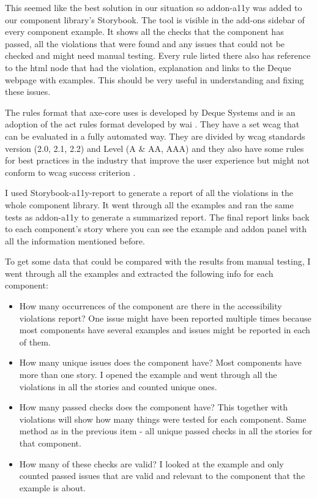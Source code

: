 \documentclass{master_thesis}
\begin{document}
This seemed like the best solution in our situation so addon-a11y was added to our component library’s Storybook. The tool is visible in the add-ons sidebar of every component example. It shows all the checks that the component has passed, all the violations that were found and any issues that could not be checked and might need manual testing. Every rule listed there also has reference to the \ac{html} node that had the violation, explanation and links to the Deque webpage with examples. This should be very useful in understanding and fixing these issues.

The rules format that axe-core uses is developed by Deque Systems and is an adoption of the \ac{act} rules format developed by \ac{wai} \citep{Fiers2017}. They have a set \ac{wcag} that can be evaluated in a fully automated way. They are divided by \ac{wcag} standards version (2.0, 2.1, 2.2) and Level (A \& AA, AAA) and they also have some rules for best practices in the industry that improve the user experience but might not conform to \ac{wcag} success criterion \citep{Fiers2023}.

I used Storybook-a11y-report \citep{Karube2020} to generate a report of all the violations in the whole component library. It went through all the examples and ran the same tests as addon-a11y to generate a summarized report. The final report links back to each component's story where you can see the example and addon panel with all the information mentioned before. 

To get some data that could be compared with the results from manual testing, I went through all the examples and extracted the following info for each component:

\begin{itemize}
	\item How many occurrences of the component are there in the accessibility violations report? One issue might have been reported multiple times because most components have several examples and issues might be reported in each of them.
	\item How many unique issues does the component have? Most components have more than one story. I opened the example and went through all the violations in all the stories and counted unique ones.
	\item How many passed checks does the component have? This together with violations will show how many things were tested for each component. Same method as in the previous item - all unique passed checks in all the stories for that component.
	\item How many of these checks are valid? I looked at the example and only counted passed issues that are valid and relevant to the component that the example is about.
\end{itemize}
\end{document}
